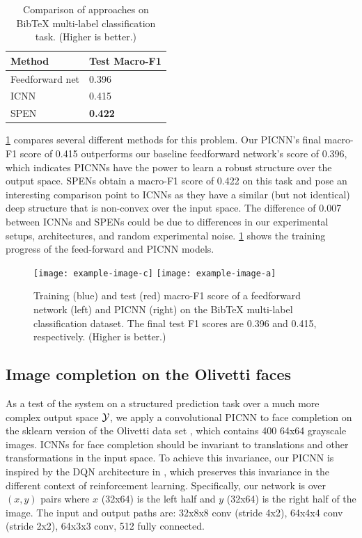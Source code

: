 \begin{table}
\begin{center}
\begin{tabular}{@{}ll@{}}
Method & Test Macro-F1 \\ \hline
Feedforward net & 0.396 \\
ICNN & 0.415 \\
SPEN \citep{belanger2016structured} & \textbf{0.422} \\
\end{tabular}
\caption{Comparison of approaches on BibTeX multi-label classification task.
(Higher is better.)}
\label{table:bibtex}
\end{center}
\end{table}
\cref{table:bibtex} compares several different methods for this problem.
Our PICNN's final macro-F1 score of 0.415 outperforms our
baseline feedforward network's score of 0.396,
which indicates PICNNs have the power to learn a robust
structure over the output space.
SPENs obtain a macro-F1 score of 0.422 on this task \citep{belanger2016structured}
and pose an interesting comparison point to ICNNs as they have
a similar (but not identical) deep structure that is non-convex
over the input space.
The difference of 0.007 between ICNNs and SPENs could be due
to differences in our experimental setups, architectures,
and random experimental noise.
\cref{fig:exp:ml:f1} shows the training progress of the
feed-forward and PICNN models.

\begin{figure}[h]
  \centering
    \texttt{[image: example-image-c]}
    \texttt{[image: example-image-a]}
  \caption{
    Training (blue) and test (red) macro-F1 score of
    a feedforward network (left) and PICNN (right) on the BibTeX
    multi-label classification dataset.
    The final test F1 scores are 0.396 and 0.415, respectively.
    (Higher is better.)
  }
  \label{fig:exp:ml:f1}
\end{figure}

\subsection{Image completion on the Olivetti faces}
As a test of the system on a structured prediction task over a
much more complex output space $\cal{Y}$, we apply a
convolutional PICNN to face completion on the
sklearn version \citep{pedregosa2011scikit} of the Olivetti
data set \citep{samaria1994parameterisation}, which contains
400 64x64 grayscale images.
ICNNs for face completion should be invariant to translations
and other transformations in the input space.
To achieve this invariance, our PICNN is inspired by the
DQN architecture in \citet{mnih2015human}, which preserves
this invariance in the different context of reinforcement learning.
Specifically, our network
is over $(x,y)$ pairs where
$x$ (32x64) is the left half and $y$ (32x64)
is the right half of the image.
The input and output paths are:
32x8x8 conv (stride 4x2), 64x4x4 conv (stride 2x2),
64x3x3 conv, 512 fully connected.

